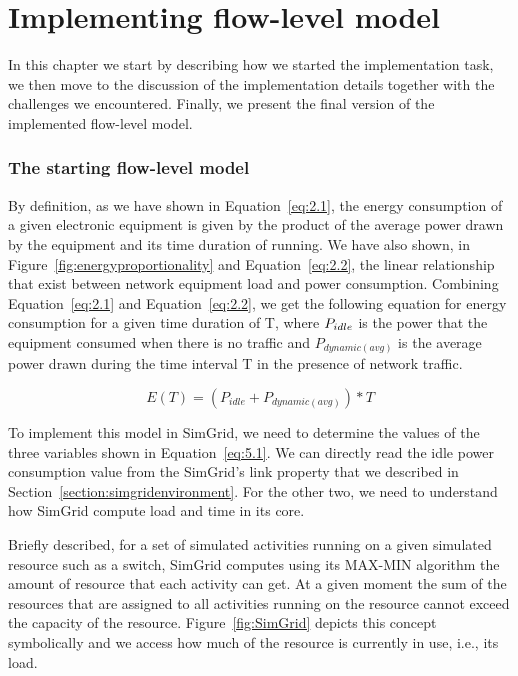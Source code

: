 \chapter{Implementing flow-level model}
\label{chapter:implementation}

In this chapter we start by describing how we started the implementation task, we then move to the discussion of the implementation details together with the challenges we encountered. Finally, we present the final version of the implemented flow-level model. 
\subsection{The starting flow-level model}

By definition, as we have shown in Equation~\ref{eq:2.1}, the energy consumption of a given electronic equipment is given by the product of the average power drawn by the equipment and its time duration of running. We have also shown, in Figure~\ref{fig:energyproportionality} and Equation~\ref{eq:2.2}, the linear relationship that exist between network equipment load and power consumption. Combining Equation~\ref{eq:2.1} and Equation~\ref{eq:2.2}, we get the following equation for energy consumption for a given time duration of T, where \($$P_{idle}$$\) is the power that the equipment consumed when there is no traffic and \(P_{dynamic (avg)}\) is the average power drawn during the time interval T in the presence of network traffic.

\begin{equation} \label{eq:5.1}
E(T) = (P_{idle} + P_{dynamic (avg)}) * T 
\end{equation} 

To implement this model in SimGrid, we need to determine the values of the three variables shown in Equation~\ref{eq:5.1}. We can directly read the idle power consumption value from the SimGrid's link property that we described in Section~\ref{section:simgridenvironment}. For the other two, we need to understand how SimGrid compute load and time in its core. 

Briefly described, for a set of simulated activities running on a given simulated resource such as a switch, SimGrid computes using its MAX-MIN algorithm the amount of resource that each activity can get. At a given moment the sum of the resources that are assigned to all activities running on the resource cannot exceed the capacity of the resource. Figure~\ref{fig:SimGrid} depicts this concept symbolically and we access how much of the resource is currently in use, i.e., its load. 

